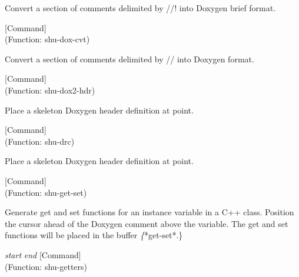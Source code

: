 \begin{doc-string}
Convert a section of comments delimited by //! into Doxygen brief format.
\end{doc-string}

\vspace{1em}
\noindent
{}
\usebox{\funcname}
 \hfill [Command]\\%
 (Function: shu-dox-cvt)

\begin{doc-string}
Convert a section of comments delimited by // into Doxygen format.
\end{doc-string}

\vspace{1em}
\noindent
{}
\usebox{\funcname}
 \hfill [Command]\\%
 (Function: shu-dox2-hdr)

\begin{doc-string}
Place a skeleton Doxygen header definition at point.
\end{doc-string}

\vspace{1em}
\noindent
{}
\usebox{\funcname}
 \hfill [Command]\\%
 (Function: shu-drc)

\begin{doc-string}
Place a skeleton Doxygen header definition at point.
\end{doc-string}

\vspace{1em}
\noindent
{}
\usebox{\funcname}
 \hfill [Command]\\%
 (Function: shu-get-set)

\begin{doc-string}
Generate get and set functions for an instance variable in a C++ class.
Position the cursor ahead of the Doxygen comment above the variable.  The get
and set functions will be placed in the buffer \emph\{*get-set*.\}
\end{doc-string}

\vspace{1em}
\noindent
{}
\usebox{\funcname}\emph{start} \emph{end}
 \hfill [Command]\\%
 (Function: shu-getters)


